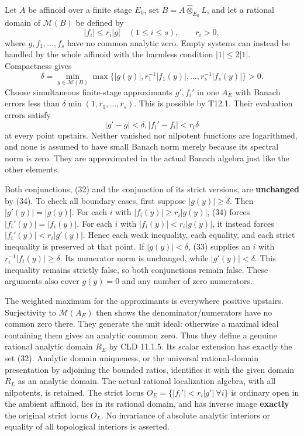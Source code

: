 \documentclass[
  10pt,
]{article}
\begin{document}
Let \(A\) be affinoid over a finite stage \(E_0\), set
\(B=A\widehat\otimes_{E_0}L\), and let a rational domain of
\(\mathcal M(B)\) be defined by \[
             |f_i|\le r_i|g|\quad(1\le i\le s),
             \qquad r_i>0,                              \tag{32}
\] where \(g,f_1,\ldots,f_s\) have no common analytic zero. Empty
systems can instead be handled by the whole affinoid with the harmless
condition \(|1|\le2|1|\). Compactness gives \[
 \delta=\min_{y\in\mathcal M(B)}
             \max\{|g(y)|,r_1^{-1}|f_1(y)|,\ldots,
                                  r_s^{-1}|f_s(y)|\}>0.
                                                               \tag{33}
\] Choose simultaneous finite-stage approximants \(g',f_i'\) in one
\(A_E\) with Banach errors less than \(\delta\min(1,r_1,\ldots,r_s)\).
This is possible by T12.1. Their evaluation errors satisfy \[
                 |g'-g|<\delta,
                 |f_i'-f_i|<r_i\delta                 \tag{34}
\] at every point upstairs. Neither vanished nor nilpotent functions are
logarithmed, and none is assumed to have small Banach norm merely
because its spectral norm is zero. They are approximated in the actual
Banach algebra just like the other elements.

Both conjunctions, (32) and the conjunction of its strict versions, are
\textbf{unchanged} by (34). To check all boundary cases, first suppose
\(|g(y)|\ge\delta\). Then \(|g'(y)|=|g(y)|\). For each \(i\) with
\(|f_i(y)|\ge r_i|g(y)|\), (34) forces \(|f_i'(y)|=|f_i(y)|\). For each
\(i\) with \(|f_i(y)|<r_i|g(y)|\), it instead forces
\(|f_i'(y)|<r_i|g'(y)|\). Hence each weak inequality, each equality, and
each strict inequality is preserved at that point. If \(|g(y)|<\delta\),
(33) supplies an \(i\) with \(r_i^{-1}|f_i(y)|\ge\delta\). Its numerator
norm is unchanged, while \(|g'(y)|<\delta\). This inequality remains
strictly false, so both conjunctions remain false. These arguments also
cover \(g(y)=0\) and any number of zero numerators.

The weighted maximum for the approximants is everywhere positive
upstairs. Surjectivity to \(\mathcal M(A_E)\) then shows the
denominator/numerators have no common zero there. They generate the unit
ideal: otherwise a maximal ideal containing them gives an analytic
common zero. Thus they define a genuine rational analytic domain \(R_E\)
by CLD 11.1.5. Its scalar extension has exactly the set (32). Analytic
domain uniqueness, or the universal rational-domain presentation by
adjoining the bounded ratios, identifies it with the given domain
\(R_L\) as an analytic domain. The actual rational localization algebra,
with all nilpotents, is retained. The strict locus
\(O_E=\{|f_i'|<r_i|g'|\ \forall i\}\) is ordinary open in the ambient
affinoid, lies in its rational domain, and has inverse image
\textbf{exactly} the original strict locus \(O_L\). No invariance of
absolute analytic interiors or equality of all topological interiors is
asserted.
\end{document}
